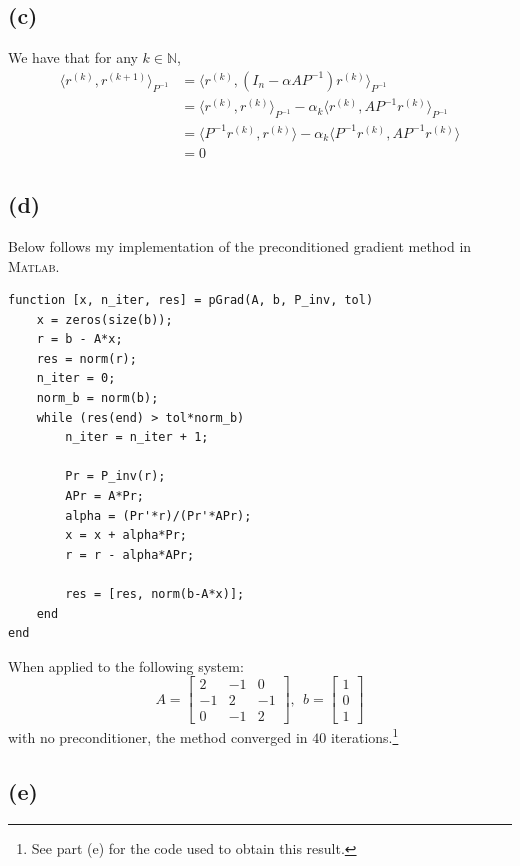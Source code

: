 \documentclass{article}
\newcommand{\inner}[2]{\langle #1, #2 \rangle}
\begin{document}
\subsection*{(c)}

We have that for any $k \in \mathbb{N}$,
\begin{align*}
	\inner{r^{(k)}}{r^{(k+1)}}_{P^{-1}} &= 
	\inner{r^{(k)}}{(I_n - \alpha AP^{-1})r^{(k)}}_{P^{-1}}\\
	&= \inner{r^{(k)}}{r^{(k)}}_{P^{-1}} - \alpha_k
	\inner{r^{(k)}}{AP^{-1}r^{(k)}}_{P^{-1}}\\
	&= \inner{P^{-1}r^{(k)}}{r^{(k)}} - \alpha_k
	\inner{P^{-1}r^{(k)}}{AP^{-1}r^{(k)}}\\
	&= 0
\end{align*}

\subsection*{(d)}

Below follows my implementation of the preconditioned gradient
method in \textsc{Matlab}.
\begin{Verbatim}[frame=single,
	label=\textsc{Matlab} code - pGrad.m]
% Preconditioned gradient method
function [x, n_iter, res] = pGrad(A, b, P_inv, tol)
	x = zeros(size(b));
	r = b - A*x;
	res = norm(r);
	n_iter = 0;
	norm_b = norm(b);
	while (res(end) > tol*norm_b)
		n_iter = n_iter + 1;

		Pr = P_inv(r);
		APr = A*Pr;
		alpha = (Pr'*r)/(Pr'*APr);
		x = x + alpha*Pr;
		r = r - alpha*APr;

		res = [res, norm(b-A*x)];
	end
end
\end{Verbatim}

When applied to the following system:
\begin{equation*}
	A = 
	\begin{bmatrix}
		2 & -1 & 0\\
		-1 & 2 & -1\\
		0 & -1 & 2
	\end{bmatrix},
	~~
	b =
	\begin{bmatrix}
		1\\ 0\\ 1
	\end{bmatrix}
\end{equation*}
with no preconditioner, the method converged in $40$
iterations.\footnote{See part (e) for the code used to obtain this
result.}

\subsection*{(e)}
\end{document}
